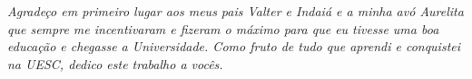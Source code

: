 \begin{dedicatoria}
   \vspace*{\fill}
   \centering
   \noindent
   \textit{Agradeço em primeiro lugar aos meus pais Valter e Indaiá e a minha avó Aurelita que sempre me incentivaram e fizeram o máximo para que eu tivesse uma boa educação e chegasse a Universidade. Como fruto de tudo que aprendi e conquistei na UESC, dedico este trabalho a vocês.} \vspace*{\fill}
\end{dedicatoria}
